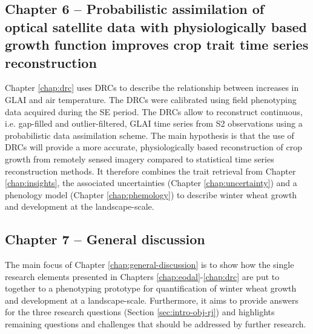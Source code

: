 \subsection*{Chapter 6 -- Probabilistic assimilation of optical satellite data with physiologically based growth function improves crop trait time series reconstruction}
Chapter \ref{chap:drc} uses \gls{DRC}s to describe the relationship between increases in \gls{GLAI} and air temperature. The \gls{DRC}s were calibrated using field phenotyping data acquired during the \gls{SE} period. The \gls{DRC}s allow to reconstruct continuous, i.e. gap-filled and outlier-filtered, \gls{GLAI} time series from \gls{S2} observations using a probabilistic data assimilation scheme. The main hypothesis is that the use of \gls{DRC}s will provide a more accurate, physiologically based reconstruction of crop growth from remotely sensed imagery compared to statistical time series reconstruction methods. It therefore combines the trait retrieval from Chapter \ref{chap:insights}, the associated uncertainties (Chapter \ref{chap:uncertainty}) and a phenology model (Chapter \ref{chap:phemology}) to describe winter wheat growth and development at the landscape-scale.

\subsection*{Chapter 7 -- General discussion}
The main focus of Chapter \ref{chap:general-discussion} is to show how the single research elements presented in Chapters \ref{chap:eodal}-\ref{chap:drc} are put to together to a phenotyping prototype for quantification of winter wheat growth and development at a landscape-scale. Furthermore, it aims to provide answers for the three research questions (Section \ref{sec:intro-obj-rj}) and highlights remaining questions and challenges that should be addressed by further research.